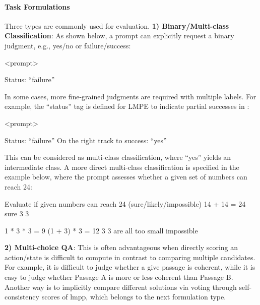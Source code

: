 \paragraph{Task Formulations}
Three types are commonly used for evaluation.
\textbf{1) Binary/Multi-class Classification}:
As shown below, a prompt can explicitly request a binary judgment, e.g., yes/no or failure/success:
\begin{numberedquote}
    <prompt>
    \begin{myshadowbox}
    Status: “failure”
    \end{myshadowbox}
\label{quote:lmpr_value1_koh}
\end{numberedquote}
In some cases, more fine-grained judgments are required with multiple labels. For example, the “status” tag is defined for LMPE to indicate partial successes in \citet{koh2024tree}:
\begin{numberedquote}
    <prompt>
    \begin{myshadowbox}
    Status: “failure” \newline
    On the right track to success: “yes” 
    \end{myshadowbox}
\label{quote:lmpr_value1_koh2}
\end{numberedquote}
This can be considered as multi-class classification, where ``yes'' yields an intermediate class.
A more direct multi-class classification is specified in the example below, where the prompt assesses whether a given set of numbers can reach 24:
\begin{numberedquote}
Evaluate if given numbers can reach 24 (sure/likely/impossible)
     14
     + 14 = 24
    \newline
    sure
    \newline {} 3 3
    \begin{myshadowbox}
    1 * 3 * 3 = 9
    \newline
    (1 + 3) * 3 = 12
     3 3 are all too small
    \newline
    impossible
    \end{myshadowbox}
\label{quote:lmpr_value2tot}
\end{numberedquote}
\textbf{2) Multi-choice QA}:
This is often advantageous when directly scoring an action/state is difficult to compute in contrast to comparing multiple candidates. For example, it is difficult to judge whether a give passage is coherent, while it is easy to judge whether Passage A is more or less coherent than Passage B.  Another way is to implicitly compare different solutions via voting through self-consistency scores of $\text{lmpp}$, which belongs to the next formulation type.
